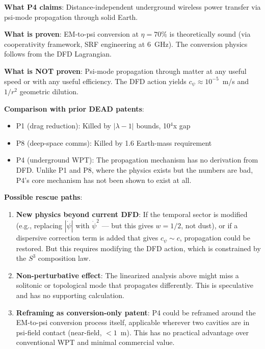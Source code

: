 \documentclass[11pt]{article}
\begin{document}
\begin{tcolorbox}[colback=yellow!5!white, colframe=yellow!60!black,
  title=\textbf{P4 STATUS ASSESSMENT}]

\textbf{What P4 claims}: Distance-independent underground wireless power
transfer via psi-mode propagation through solid Earth.

\textbf{What is proven}: EM-to-psi conversion at $\eta = 70\%$ is
theoretically sound (via cooperativity framework, SRF engineering at
6~GHz). The conversion physics follows from the DFD Lagrangian.

\textbf{What is NOT proven}: Psi-mode propagation through matter at
any useful speed or with any useful efficiency. The DFD action yields
$c_\psi \approx 10^{-5}$~m/s and $1/r^2$ geometric dilution.

\textbf{Comparison with prior DEAD patents}:
\begin{itemize}[nosep]
\item P1 (drag reduction): Killed by $|\lambda-1|$ bounds, 10$^4$x gap
\item P8 (deep-space comms): Killed by 1.6 Earth-mass requirement
\item P4 (underground WPT): The propagation mechanism has no derivation
  from DFD. Unlike P1 and P8, where the physics exists but the numbers
  are bad, P4's core mechanism has not been shown to exist at all.
\end{itemize}

\textbf{Possible rescue paths}:
\begin{enumerate}
\item \textbf{New physics beyond current DFD}: If the temporal sector is
  modified (e.g., replacing $|\dot\psi|$ with $\dot\psi^2$ --- but this
  gives $w = 1/2$, not dust), or if a dispersive correction term is added
  that gives $c_\psi \sim c$, propagation could be restored. But this
  requires modifying the DFD action, which is constrained by the $S^3$
  composition law.

\item \textbf{Non-perturbative effect}: The linearized analysis above
  might miss a solitonic or topological mode that propagates differently.
  This is speculative and has no supporting calculation.

\item \textbf{Reframing as conversion-only patent}: P4 could be reframed
  around the EM-to-psi conversion process itself, applicable wherever
  two cavities are in psi-field contact (near-field, $< 1$~m). This has
  no practical advantage over conventional WPT and minimal commercial value.


\end{enumerate}
\end{tcolorbox}
\end{document}
